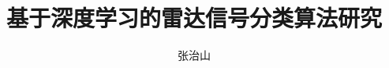 \documentclass[twoside]{nputhesis}
\title[A Research on Radar Signal Classification using Deep Learning Based Techniques]{基于深度学习的雷达信号分类算法研究}
\author[Zhishan Zhang]{张治山}
\begin{document}
\makecover
\frontmatter





\tableofcontents

\mainmatter







\backmatter



\Appendix



\Thanks



\Work


\statement
\end{document}
